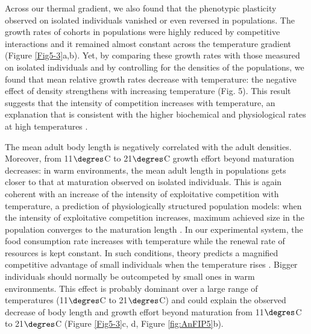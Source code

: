 Across our thermal gradient, we also found that the phenotypic plasticity
observed on isolated individuals vanished or even reversed in populations. The
growth rates of cohorts in populations were highly reduced by competitive
interactions and it remained almost constant across the temperature gradient
(Figure \ref{Fig5-3}a,b). Yet, by comparing these growth rates with those
measured on isolated individuals and by controlling for the densities of the populations, we
found that mean relative growth rates decrease with temperature: the negative
effect of density strengthens with increasing temperature (Fig. 5). This result
suggests that the intensity of competition increases with temperature, an
explanation that is consistent with the higher biochemical and physiological
rates at high temperatures \autocites{gillooly2001a}.

The mean adult body length is negatively correlated with the adult densities.
Moreover, from 11$\degres$C to 21$\degres$C growth effort beyond maturation
decreases:
in warm environments, the mean adult length in populations gets closer to that
at maturation observed on isolated individuals. This is again coherent with an
increase of the intensity of exploitative competition with temperature, a
prediction of physiologically structured population models: when the intensity
of exploitative competition increases, maximum achieved size in the population
converges to the maturation length \autocites{metz1986a,de-roos1997a}. In our
experimental system, the food consumption rate increases with temperature while
the renewal rate of resources is kept constant. In such conditions, theory
predicts a magnified competitive advantage of small individuals when the
temperature rises \autocites{ohlberger2011a}. Bigger individuals should normally
be outcompeted by small ones in warm environments. This effect is probably
dominant over a large range of temperatures (11$\degres$C to 21$\degres$C) and
could explain the observed decrease of body length and growth effort beyond
maturation from 11$\degres$C to 21$\degres$C (Figure \ref{Fig5-3}c, d, Figure
\ref{fig:AnFIP5}b).


